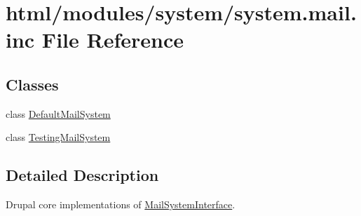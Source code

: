 \hypertarget{system_8mail_8inc}{
\section{html/modules/system/system.mail.inc File Reference}
\label{system_8mail_8inc}
}
\subsection*{Classes}
\begin{DoxyCompactItemize}
\item 
class \hyperlink{classDefaultMailSystem}{DefaultMailSystem}
\item 
class \hyperlink{classTestingMailSystem}{TestingMailSystem}
\end{DoxyCompactItemize}


\subsection{Detailed Description}
Drupal core implementations of \hyperlink{interfaceMailSystemInterface}{MailSystemInterface}. 